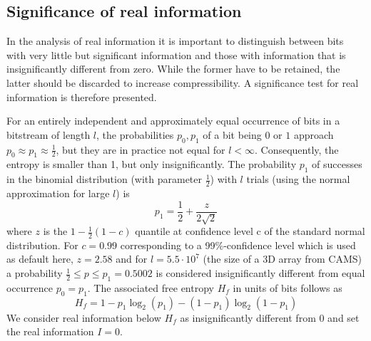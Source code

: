 \subsection{Significance of real information}

In the analysis of real information it is important to distinguish between bits with very little but significant information and
those with information that is insignificantly different from zero. While the former have to be retained, the latter should be
discarded to increase compressibility. A significance test for real information is therefore presented.

For an entirely independent and approximately equal occurrence of bits in a bitstream of length $l$, the probabilities $p_0,p_1$
of a bit being $0$ or $1$ approach $p_0 \approx p_1 \approx \tfrac{1}{2}$, but they are in practice not equal for $l<\infty$.
Consequently, the entropy is smaller than 1, but only insignificantly. The probability $p_1$ of successes in the binomial distribution
(with parameter $\tfrac{1}{2}$) with $l$ trials (using the normal approximation for large $l$) is
	\begin{equation}
	p_1 = \frac{1}{2} + \frac{z}{2\sqrt{2}}
	\end{equation}
where $z$ is the $1-\tfrac{1}{2}(1-c)$ quantile at confidence level c of the standard normal distribution. For $c = 0.99$ corresponding
to a 99\%-confidence level which is used as default here, $z = 2.58$ and for $l = 5.5 \cdot 10^7$  (the size of a 3D array from CAMS)
a probability $\tfrac{1}{2} \leq p \leq p_1 = 0.5002$ is considered insignificantly different from equal occurrence $p_0 = p_1$.
The associated free entropy $H_f$ in units of bits follows as
	\begin{equation}
	H_f = 1 - p_1\log_2(p_1) - (1-p_1)\log_2(1-p_1)
	\end{equation}
We consider real information below $H_f$ as insignificantly different from 0 and set the real information $I = 0$.

